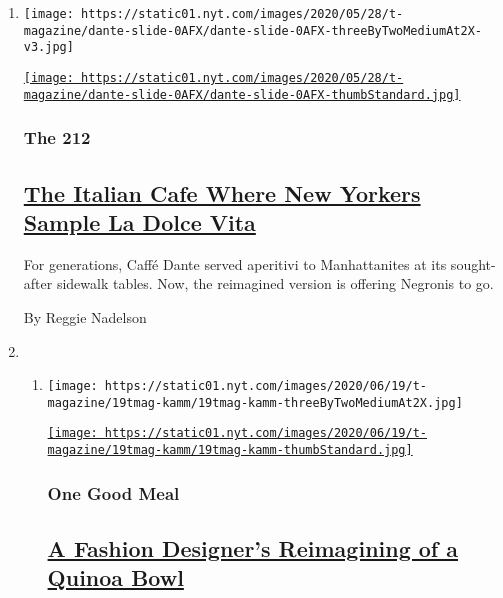 \begin{enumerate}
\def\labelenumi{\arabic{enumi}.}
\item
  \texttt{[image: https://static01.nyt.com/images/2020/05/28/t-magazine/dante-slide-0AFX/dante-slide-0AFX-threeByTwoMediumAt2X-v3.jpg]}

  \href{/2020/06/12/t-magazine/caffe-dante-nyc.html}{\texttt{[image: https://static01.nyt.com/images/2020/05/28/t-magazine/dante-slide-0AFX/dante-slide-0AFX-thumbStandard.jpg]}}

  \hypertarget{the-212}{%
  \subsubsection{The 212}\label{the-212}}

  \hypertarget{the-italian-cafe-where-new-yorkers-sample-la-dolce-vita}{%
  \subsection{\texorpdfstring{\href{/2020/06/12/t-magazine/caffe-dante-nyc.html}{The
  Italian Cafe Where New Yorkers Sample La Dolce
  Vita}}{The Italian Cafe Where New Yorkers Sample La Dolce Vita}}\label{the-italian-cafe-where-new-yorkers-sample-la-dolce-vita}}

  For generations, Caffé Dante served aperitivi to Manhattanites at its
  sought-after sidewalk tables. Now, the reimagined version is offering
  Negronis to go.

  By Reggie Nadelson
\item
  \begin{enumerate}
  \def\labelenumii{\arabic{enumii}.}
  \item
    \texttt{[image: https://static01.nyt.com/images/2020/06/19/t-magazine/19tmag-kamm/19tmag-kamm-threeByTwoMediumAt2X.jpg]}

    \href{/2020/06/26/t-magazine/jesse-kamm-quinoa-bowl-recipe.html}{\texttt{[image: https://static01.nyt.com/images/2020/06/19/t-magazine/19tmag-kamm/19tmag-kamm-thumbStandard.jpg]}}

    \hypertarget{one-good-meal}{%
    \subsubsection{One Good Meal}\label{one-good-meal}}

    \hypertarget{a-fashion-designers-reimagining-of-a-quinoa-bowl}{%
    \subsection{\texorpdfstring{\href{/2020/06/26/t-magazine/jesse-kamm-quinoa-bowl-recipe.html}{A
    Fashion Designer's Reimagining of a Quinoa
    Bowl}}{A Fashion Designer's Reimagining of a Quinoa Bowl}}\label{a-fashion-designers-reimagining-of-a-quinoa-bowl}}


\end{enumerate}
\end{enumerate}
